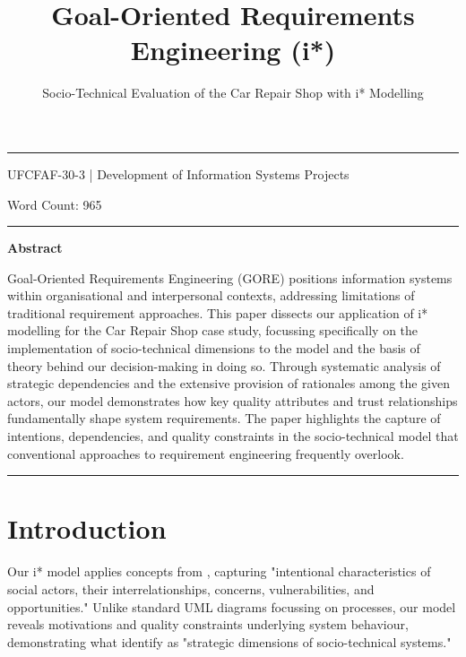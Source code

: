 \documentclass[14pt,a4paper]{article}
\title{Goal-Oriented Requirements Engineering (i*)}
\author{Socio-Technical Evaluation of the Car Repair Shop with i* Modelling}
\date{}
\begin{document}
\maketitle

\hrule

\vspace{3em}

UFCFAF-30-3 | Development of Information Systems Projects

Word Count: 965

\vspace{3em}
\hrule

\vspace{2em}

\textbf{\Large{Abstract}}
\vspace{1em}

Goal-Oriented Requirements Engineering (GORE) positions information systems within organisational and interpersonal contexts, addressing limitations of traditional requirement approaches. This paper dissects our application of i* modelling for the Car Repair Shop case study, focussing specifically on the implementation of socio-technical dimensions to the model and the basis of theory behind our decision-making in doing so. Through systematic analysis of strategic dependencies and the extensive provision of rationales among the given actors, our model demonstrates how key quality attributes and trust relationships fundamentally shape system requirements. The paper highlights the capture of intentions, dependencies, and quality constraints in the socio-technical model that conventional approaches to requirement engineering frequently overlook.

\vspace{3em}
\hrule

\thispagestyle{empty}

\tableofcontents
{}

\newpage


\section{Introduction}

Our i* model  applies concepts from \textcite[p. 127]{Yu2011}, capturing "intentional characteristics of social actors, their interrelationships, concerns, vulnerabilities, and opportunities." Unlike standard UML diagrams focussing on processes, our model reveals motivations and quality constraints underlying system behaviour, demonstrating what \textcite[p. 342]{Dalpiaz2016} identify as "strategic dimensions of socio-technical systems."
\end{document}
